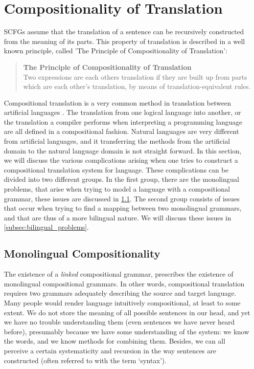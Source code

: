 \documentclass{report}
\begin{document}
\section{Compositionality of Translation}
\label{sec:comp_trans}

SCFGs assume that the translation of a sentence can be recursively constructed from the meaning of its parts. This property of translation is described in a well known principle, called 'The Principle of Compositionality of Translation':

\begin{quote}
\textbf{The Principle of Compositionality of Translation}\\
Two expressions are each others translation if they are built up from parts which are each other's translation, by means of translation-equivalent rules. \citep[e.g.,][]{janssen1998algebraic} \end{quote}

Compositional translation is a very common method in translation between artificial languages \citep{janssen1996compositionality,janssen1998algebraic}. The translation from one logical language into another, or the translation a compiler performs when interpreting a programming language are all defined in a compositional fashion. Natural languages are very different from artificial languages, and it transferring the methods from the artificial domain to the natural language domain is not straight forward. In this section, we will discuss the various complications arising when one tries to construct a compositional translation system for language. These complications can be divided into two different groups. In the first group, there are the monolingual problems, that arise when trying to model a language with a compositional grammar, these issues are discussed in \ref{subsec:monolingual_problems}. The second group consists of issues that occur when trying to find a mapping between two monolingual grammars, and that are thus of a more bilingual nature. We will discuss these issues in \ref{subsec:bilingual_problems}.

\subsection{Monolingual Compositionality}
\label{subsec:monolingual_problems}

The existence of a \textit{linked} compositional grammar, prescribes the existence of monolingual compositional grammars. In other words, compositional translation requires two grammars adequately describing the source and target language. Many people would render language intuitively compositional, at least to some extent. We do not store the meaning of all possible sentences in our head, and yet we have no trouble understanding them (even sentences we have never heard before), presumably because we have some understanding of the system: we know the words, and we know methods for combining them. Besides, we can all perceive a certain systematicity and recursion in the way sentences are constructed (often referred to with the term `syntax').
\end{document}
